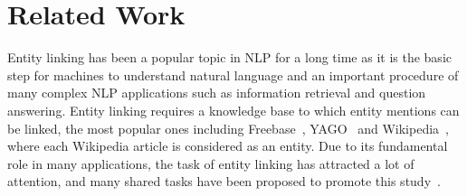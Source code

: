 \section{Related Work}

Entity linking has been a popular topic in NLP for a long time as it is the basic step for machines to understand natural language and an important procedure of many complex NLP applications such as information retrieval and question answering. Entity linking requires a knowledge base to which entity mentions can be linked, the most popular ones including Freebase~\cite{bollacker2008freebase}, YAGO~\cite{suchanek2007yago} and Wikipedia~\cite{cai2013wikification}, where each Wikipedia article is considered as an entity. 
Due to its fundamental role in many applications, the task of entity linking has attracted a lot of attention, and many shared tasks have been proposed to promote this study~\cite{ji2010overview,cano2014microposts2014,carmel2014erd}.
